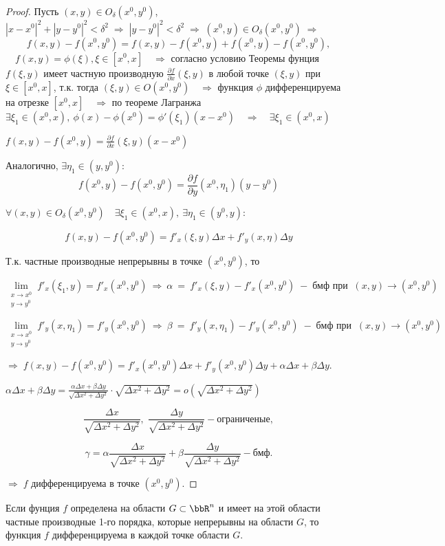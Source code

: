\begin{proof}
Пусть $(x,y) \in O_\delta(x^0, y^0)$, $|x - x^0|^2 + |y - y^0|^2 < \delta^2 \; \Rightarrow \; |y - y^0|^2 < \delta^2 \; \Rightarrow \; (x^0, y) \in O_\delta(x^0, y^0) \; \Rightarrow \; $
$$
f(x,y) - f(x^0, y^0) = f(x,y) - f(x^0, y) + f(x^0, y) - f(x^0, y^0),
$$
$ \quad f(x,y) = \phi(\xi), \xi \in [x^0, x] \quad \Rightarrow$ согласно условию Теоремы фунция $f(\xi, y)$ имеет частную производную $\frac{\partial f}{\partial x}(\xi, y)$ в любой точке $(\xi, y)$  при $\xi \in [x^0, x]$, т.к. тогда $(\xi, y) \in O(x^0, y^0) \quad \Rightarrow$ функция $\phi$ дифференцируема на отрезке $[x^0, x] \quad \Rightarrow$ по теореме Лагранжа $\exists \xi_1 \in (x^0, x), \: \phi(x) - \phi(x^0) = \phi'(\xi_1)(x - x^0) \quad \Rightarrow \quad \exists \xi_1 \in (x^0, x)$

$f(x,y) - f(x^0, y) = \frac{\partial f}{\partial x}(\xi, y)(x - x^0)$

Аналогично, $\exists \eta_1 \in (y, y^0)$:
$$
f(x^0, y) - f(x^0, y^0) = \frac{\partial f}{\partial y}(x^0, \eta_1)(y - y^0)
$$ 

$\forall (x,y) \in O_\delta(x^0, y^0) \quad \exists \xi_1 \in (x^0, x), \: \exists \eta_1 \in (y^0, y):$

$$
f(x,y) - f(x^0, y^0) = f'_x(\xi, y) \Delta x + f'_y(x, \eta) \Delta y
$$

Т.к. частные производные непрерывны в точке $(x^0, y^0)$, то

$$
\lim\limits_{\substack{x \to x^0 \\ y \to y^0}} f'_x(\xi_1, y) = f'_x(x^0, y^0) \: \Rightarrow \: \alpha \: = \: f'_x(\xi, y) - f'_x(x^0, y^0) \; - \; \textit{бмф при } \: (x,y) \to (x^0, y^0)
$$

$$
\lim\limits_{\substack{x \to x^0 \\ y \to y^0}} f'_y(x, \eta_1) = f'_y(x^0, y^0) \: \Rightarrow \: \beta \: = \: f'_y(x, \eta_1) - f'_y(x^0, y^0) \; - \; \textit{бмф при } \: (x,y) \to (x^0, y^0)
$$

$\Rightarrow \; f(x,y) - f(x^0, y^0) = f'_x(x^0, y^0) \Delta x + f'_y(x^0, y^0) \Delta y + \alpha \Delta x + \beta \Delta y$.

$\alpha \Delta x + \beta \Delta y = \frac{\alpha \Delta x + \beta \Delta y}{\sqrt{\Delta x^2 + \Delta y^2}} \cdot \sqrt{\Delta x^2 + \Delta y^2} = o(\sqrt{\Delta x^2 + \Delta y^2})$

$$
\frac{\Delta x}{\sqrt{\Delta x^2 + \Delta y^2}}, \; \frac{\Delta y}{\sqrt{\Delta x^2 + \Delta y^2}} - \textit{ограниченые},
$$

$$
\gamma = \alpha \frac{\Delta x}{\sqrt{\Delta x^2 + \Delta y^2}} + \beta \frac{\Delta y}{\sqrt{\Delta x^2 + \Delta y^2}} - \textit{бмф}.
$$

$\Rightarrow \; f$ дифференцируема в точке $(x^0, y^0)$.
\end{proof}

\begin{cons}
Если фунция $f$ определена на области $G \subset \bbR^n$ и имеет на этой области частные производные 1-го порядка, которые непрерывны на области $G$, то функция $f$ дифференцируема в каждой точке области $G$.
\end{cons}